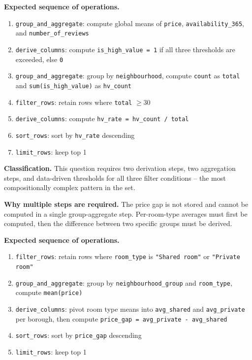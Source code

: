 \textbf{Expected sequence of operations.}
\begin{enumerate}
  \item \texttt{group\_and\_aggregate}: compute global means of \texttt{price},
    \texttt{availability\_365}, and \texttt{number\_of\_reviews}
  \item \texttt{derive\_columns}: compute \texttt{is\_high\_value = 1} if all
    three thresholds are exceeded, else \texttt{0}
  \item \texttt{group\_and\_aggregate}: group by \texttt{neighbourhood}, compute
    \texttt{count} as \texttt{total} and \texttt{sum(is\_high\_value)} as
    \texttt{hv\_count}
  \item \texttt{filter\_rows}: retain rows where \texttt{total} $\geq 30$
  \item \texttt{derive\_columns}: compute
    \texttt{hv\_rate = hv\_count / total}
  \item \texttt{sort\_rows}: sort by \texttt{hv\_rate} descending
  \item \texttt{limit\_rows}: keep top 1
\end{enumerate}

\textbf{Classification.}
This question requires two derivation steps, two aggregation steps, and data-driven thresholds for all three filter conditions -- the most compositionally complex pattern in the set.



\textbf{Why multiple steps are required.}
The price gap is not stored and cannot be computed in a single group-aggregate step. Per-room-type averages must first be computed, then the difference between two specific groups must be derived.

\textbf{Expected sequence of operations.}
\begin{enumerate}
  \item \texttt{filter\_rows}: retain rows where \texttt{room\_type} is
    \texttt{"Shared room"} or \texttt{"Private room"}
  \item \texttt{group\_and\_aggregate}: group by \texttt{neighbourhood\_group}
    and \texttt{room\_type}, compute \texttt{mean(price)}
  \item \texttt{derive\_columns}: pivot room type means into
    \texttt{avg\_shared} and \texttt{avg\_private} per borough, then
    compute \texttt{price\_gap = avg\_private - avg\_shared}
  \item \texttt{sort\_rows}: sort by \texttt{price\_gap} descending
  \item \texttt{limit\_rows}: keep top 1
\end{enumerate}

